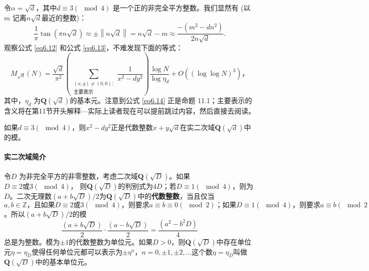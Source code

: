 \documentclass[11pt,a4paper]{article}
\theoremstyle{definition}
\newcommand{\refeq}[1]{公式 \ref{#1}}
\numberwithin{equation}{section}
\newcommand{\comma}{\text{，}}
\begin{document}
令$ \alpha=\sqrt{d}\comma\text{其中} d\equiv3\left(\!\!\mod4\right) $ 是一个正的非完全平方整数。我们显然有 (以$ m $ 记离$ n\sqrt{d} $最近的整数)：
\begin{equation}\label{eq6.13}
	\dfrac{1}{\pi}\tan\left(\pi n\sqrt{d}\right)\approx\pm\left\lVert n\sqrt{d}\right\rVert=n\sqrt{d}-m\approx\dfrac{-\left(m^{2}-dn^{2}\right)}{2n\sqrt{d}}.
\end{equation}
观察\refeq{eq6.12} 和\refeq{eq6.13}，不难发现下面的等式：
\begin{equation}\label{eq6.14}
M_{\sqrt{d}}\left(N\right)=\dfrac{\sqrt{d}}{\pi^{2}}\left(\sum_{\substack{\left(x,y\right)\neq\left(0,0\right):\\\text{主要表示}}}\dfrac{1}{x^{2}-dy^{2}}\right)\dfrac{\log N}{\log \eta_{d}}+O\left({\left(\log\log N\right)}^{3}\right)\comma
\end{equation}
其中，$ \eta_{d} $ 为$ \mathbf{Q}\left(\sqrt{d}\right) $的基本元。注意到\refeq{eq6.14} 正是命题 11.1；主要表示的含义将在第11节开头解释---实际上读者现在可以提前跳过内容，然后直接去阅读。

如果$ d\equiv3\left(\!\!\mod4\right) $，则$ x^{2}-dy^{2} $正是代数整数$ x+y\sqrt{d} $在实二次域$ \mathbf{Q}\left(\sqrt{d}\right) $中的模。
\paragraph{实二次域简介} 令$ D $ 为非完全平方的非零整数，考虑二次域$ \mathbf{Q}\left(\sqrt{D}\right) $。如果$ D\equiv2\text{或}3\left(\!\!\mod4\right) $， 则$ \mathbf{Q}\left(\sqrt{D}\right) $的判别式为$ 4D $；若$ D\equiv1\left(\!\!\mod4\right) $，则为$ D $。二次无理数$ \left(a+b\sqrt{D}\right)/2  $为$ \mathbf{Q}\left(\sqrt{D}\right) $中的\textbf{代数整数}，当且仅当$ a,b\in\mathbb{Z}\text{，且如果}D\equiv2\text{或}3\left(\!\!\mod4\right)\comma\text{则要求}a\equiv b\equiv 0\left(\!\!\mod2\right)\text{；} \text{如果}D\equiv1\left(\!\!\mod4\right)\comma\text{则要求}a\equiv b\left(\!\!\mod2\right) $。所以$ \left(a+b\sqrt{D}\right)/2  $的模
\[ \dfrac{\left(a+b\sqrt{D}\right)}{2}\cdot\dfrac{\left(a-b\sqrt{D}\right)}{2}=\dfrac{\left(a^{2}-b^{2}D\right)}{4} \]
总是为整数。模为$ \pm1 $的代数整数为单位元。如果$ D>0 $，则$ \mathbf{Q}\left(\sqrt{D}\right) $中存在单位元$ \eta=\eta_{D} $使得任何单位元都可以表示为$ \pm\eta^{n}$，$ n=0, \pm1, \pm2, \ldots $这个数$ \eta=\eta_{D}  $叫做$ \mathbf{Q}\left(\sqrt{D}\right) $中的基本单位元。
\end{document}
